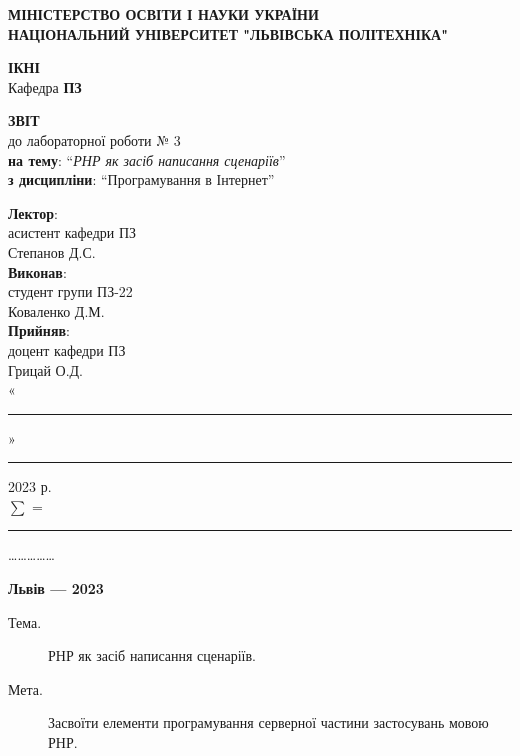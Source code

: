 \documentclass{article}
\newcommand\subject{Програмування в Інтернет}
\newcommand\lecturer{асистент кафедри ПЗ \\ Степанов Д.С.}
\newcommand\teacher{доцент кафедри ПЗ \\ Грицай О.Д.}
\newcommand\mygroup{ПЗ-22}
\newcommand\lab{3}
\newcommand\theme{РНР як засіб написання сценаріїв}
\newcommand\purpose{Засвоїти елементи програмування серверної частини застосувань мовою РНР}
\begin{document}
\begin{normalsize}
\begin{titlepage}
	\thispagestyle{empty}
	\begin{center}
		\textbf{МІНІСТЕРСТВО ОСВІТИ І НАУКИ УКРАЇНИ\\
			НАЦІОНАЛЬНИЙ УНІВЕРСИТЕТ "ЛЬВІВСЬКА ПОЛІТЕХНІКА"}
	\end{center}
	\begin{flushright}
		\textbf{ІКНІ}\\
		Кафедра \textbf{ПЗ}
	\end{flushright}
	\vspace{200pt}
	\begin{center}
		\textbf{ЗВІТ}\\
		\vspace{10pt}
		до лабораторної роботи № \lab\\
		\textbf{на тему}: “\textit{\theme}”\\
		\textbf{з дисципліни}: “\subject”
	\end{center}
	\vspace{112pt}
	\begin{flushright}
		
		\textbf{Лектор}:\\
		\lecturer\\
		\vspace{28pt}
		\textbf{Виконав}:\\
		
		студент групи \mygroup\\
		Коваленко Д.М.\\
		\vspace{28pt}
		\textbf{Прийняв}:\\
		
		\teacher\\
		
		\vspace{28pt}
		«\rule{1cm}{0.15mm}» \rule{1.5cm}{0.15mm} 2023 р.\\
		$\sum$ = \rule{1cm}{0.15mm}……………\\
		
	\end{flushright}
	\vspace{\fill}
	\begin{center}
		\textbf{Львів — 2023}
	\end{center}
\end{titlepage}
	
\begin{description}
	\item[Тема.] \theme.
	\item[Мета.] \purpose.
\end{description}


\end{normalsize}
\end{document}
